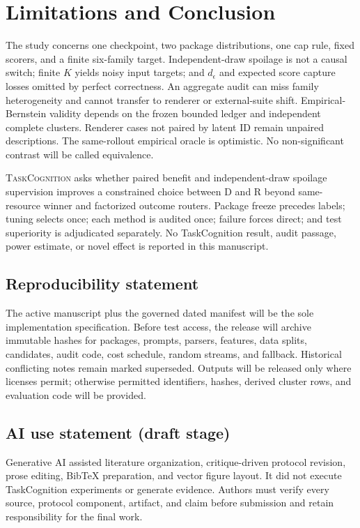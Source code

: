 \documentclass{article}
\newcommand{\TC}{\textsc{TaskCognition}}
\newcommand{\D}{\ensuremath{\mathrm{D}}}
\newcommand{\Rpol}{\ensuremath{\mathrm{R}}}
\newcommand{\1}{\mathbb{I}}
\begin{document}
\section{Limitations and Conclusion}
The study concerns one checkpoint, two package distributions, one cap rule, fixed scorers, and a finite six-family target. Independent-draw spoilage is not a causal switch; finite $K$ yields noisy input targets; and $d_\epsilon$ and expected score capture losses omitted by perfect correctness. An aggregate audit can miss family heterogeneity and cannot transfer to renderer or external-suite shift. Empirical-Bernstein validity depends on the frozen bounded ledger and independent complete clusters. Renderer cases not paired by latent ID remain unpaired descriptions. The same-rollout empirical oracle is optimistic. No non-significant contrast will be called equivalence.

\TC{} asks whether paired benefit and independent-draw spoilage supervision improves a constrained choice between \D{} and \Rpol{} beyond same-resource winner and factorized outcome routers. Package freeze precedes labels; tuning selects once; each method is audited once; failure forces direct; and test superiority is adjudicated separately. No TaskCognition result, audit passage, power estimate, or novel effect is reported in this manuscript.

\subsection*{Reproducibility statement}
The active manuscript plus the governed dated manifest will be the sole implementation specification. Before test access, the release will archive immutable hashes for packages, prompts, parsers, features, data splits, candidates, audit code, cost schedule, random streams, and fallback. Historical conflicting notes remain marked superseded. Outputs will be released only where licenses permit; otherwise permitted identifiers, hashes, derived cluster rows, and evaluation code will be provided.

\subsection*{AI use statement (draft stage)}
Generative AI assisted literature organization, critique-driven protocol revision, prose editing, BibTeX preparation, and vector figure layout. It did not execute TaskCognition experiments or generate evidence. Authors must verify every source, protocol component, artifact, and claim before submission and retain responsibility for the final work.
\end{document}
